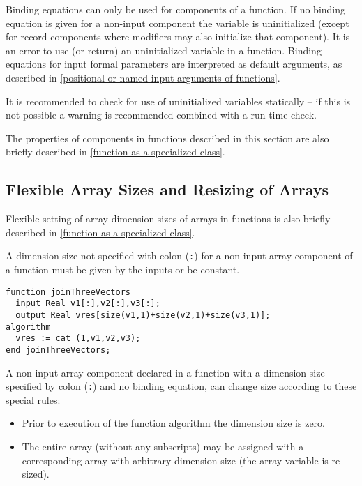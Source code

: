 Binding equations can only be used for components of a function.
If no binding equation is given for a non-input component the variable is uninitialized (except for record components where modifiers may also initialize that component).
It is an error to use (or return) an uninitialized variable in a function.
Binding equations for input formal parameters are interpreted as default arguments, as described in
\cref{positional-or-named-input-arguments-of-functions}.

\begin{nonnormative}
It is recommended to check for use of uninitialized variables statically -- if this is not possible a warning is recommended
combined with a run-time check.
\end{nonnormative}

\begin{nonnormative}
The properties of components in functions described in this
section are also briefly described in \cref{function-as-a-specialized-class}.
\end{nonnormative}

\subsection{Flexible Array Sizes and Resizing of Arrays}\label{flexible-array-sizes-and-resizing-of-arrays-in-functions}

\begin{nonnormative}
Flexible setting of array dimension sizes of arrays in
functions is also briefly described in \cref{function-as-a-specialized-class}.
\end{nonnormative}

A dimension size not specified with colon (\lstinline!:!) for a non-input array component of a function must be given by the inputs or be constant.

\begin{example}
\begin{lstlisting}[language=modelica]
function joinThreeVectors
  input Real v1[:],v2[:],v3[:];
  output Real vres[size(v1,1)+size(v2,1)+size(v3,1)];
algorithm
  vres := cat (1,v1,v2,v3);
end joinThreeVectors;
\end{lstlisting}
\end{example}

A non-input array component declared in a function with a dimension size specified by colon (\lstinline!:!) and no binding equation, can change size according to these special rules:
\begin{itemize}
\item
  Prior to execution of the function algorithm the dimension size is zero.
\item
  The entire array (without any subscripts) may be assigned with a corresponding array with arbitrary dimension size (the array variable is re-sized).
\end{itemize}

